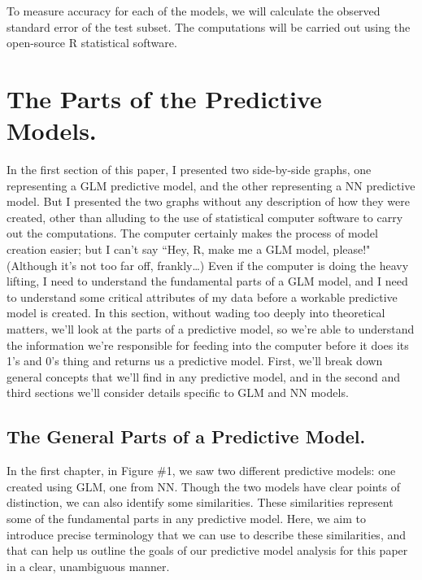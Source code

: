 \documentclass[12pt]{article}
\begin{document}
To measure accuracy for each of the models, we will calculate the observed standard error of the test subset.  The computations will be carried out
using the open-source R statistical software.


	\section{The Parts of the Predictive Models.}
In the first section of this paper, I presented two side-by-side graphs, one representing a GLM predictive model, and the other representing a NN
predictive model.  But I presented the two graphs without any description of how they were created, other than alluding to the use of statistical
computer software to carry out the computations.  The computer certainly makes the process of model creation easier; but I can't say ``Hey, R, make
me a GLM model, please!"  (Although it's not too far off, frankly\dots)  Even if the computer is doing the heavy lifting, I need to understand the
fundamental parts of a GLM model, and I need to understand some critical attributes of my data before a workable predictive model is created.  In 
this section, without wading too deeply into theoretical matters, we'll look at the parts of a predictive model, so we're able to understand the 
information we're responsible for feeding into the computer before it does its 1's and 0's thing and returns us a predictive model.  First, we'll 
break down general concepts that we'll find in any predictive model, and in the second and third sections we'll consider details specific to GLM and
NN models.


	\subsection{The General Parts of a Predictive Model.}
	In the first chapter, in Figure \#1, we saw two different predictive models:  one created using GLM, one from NN.  Though the two models
have clear points of distinction, we can also identify some similarities.  These similarities represent some of the fundamental parts in any
predictive model.  Here, we aim to introduce precise terminology that we can use to describe these similarities, and that can help us outline the
goals of our predictive model analysis for this paper in a clear, unambiguous manner.
\end{document}
